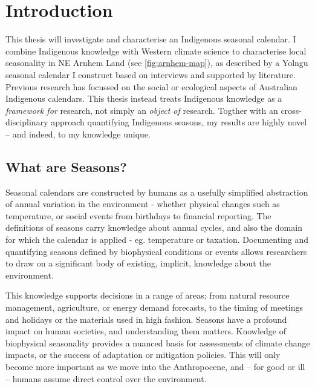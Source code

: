 \chapter{Introduction}
\label{ch:introduction}


This thesis will investigate and characterise an Indigenous seasonal calendar.
I combine Indigenous knowledge with Western climate science to characterise
local seasonality in NE Arnhem Land (see \cref{fig:arnhem-map}),
as described by a Yolngu seasonal calendar I construct based on
interviews and supported by literature.\\

Previous research has focussed on the social or ecological aspects of Australian
Indigenous calendars.  This thesis instead treats Indigenous knowledge as a
\emph{framework for} research, not simply an \emph{object of} research.
Togther with an cross-disciplinary approach quantifying Indigenous seasons,
my results are highly novel -- and indeed, to my knowledge unique.



\section{What are Seasons?}

Seasonal calendars are constructed by humans as a usefully simplified
abstraction of annual variation in the environment - whether physical
changes such as temperature, or social events from birthdays to financial
reporting.  The definitions of seasons carry knowledge about annual cycles,
and also the domain for which the calendar is applied - eg. temperature
or taxation.
%
Documenting and quantifying seasons defined by biophysical conditions
or events allows researchers to draw on a significant body of existing,
implicit, knowledge about the environment.

This knowledge supports decisions in a range of areas; from natural
resource management, agriculture, or energy demand forecasts, to
the timing of meetings and holidays or the materials used in high fashion.
Seasons have a profound impact on human societies, and understanding
them matters.  Knowledge of biophysical seasonality provides a nuanced
basis for assessments of climate change impacts, or the success of
adaptation or mitigation policies.  This will only become more important
as we move into the Anthropocene, and -- for good or ill -- humans assume
direct control over the environment.\\


